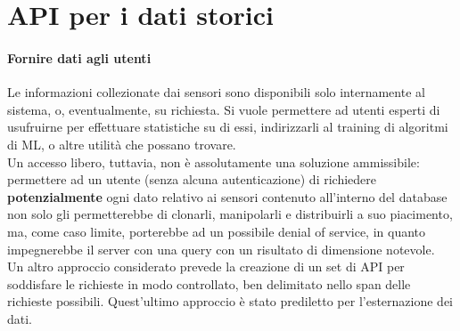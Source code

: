 \section{API per i dati storici} \label{apidatistorici}

\paragraph{Fornire dati agli utenti}
Le informazioni collezionate dai sensori sono disponibili solo internamente al sistema, o, eventualmente, su richiesta. Si vuole permettere ad utenti esperti di usufruirne per effettuare statistiche su di essi, indirizzarli al training di algoritmi di ML, o altre utilità che possano trovare.\\
Un accesso libero, tuttavia, non è assolutamente una soluzione ammissibile: permettere ad un utente (senza alcuna autenticazione) di richiedere \textbf{potenzialmente} ogni dato relativo ai sensori contenuto all'interno del database non solo gli permetterebbe di clonarli, manipolarli e distribuirli a suo piacimento, ma, come caso limite, porterebbe ad un possibile denial of service, in quanto impegnerebbe il server con una query con un risultato di dimensione notevole.\\
Un altro approccio considerato prevede la creazione di un set di API per soddisfare le richieste in modo controllato, ben delimitato nello span delle richieste possibili.
Quest'ultimo approccio è stato prediletto per l'esternazione dei dati.

